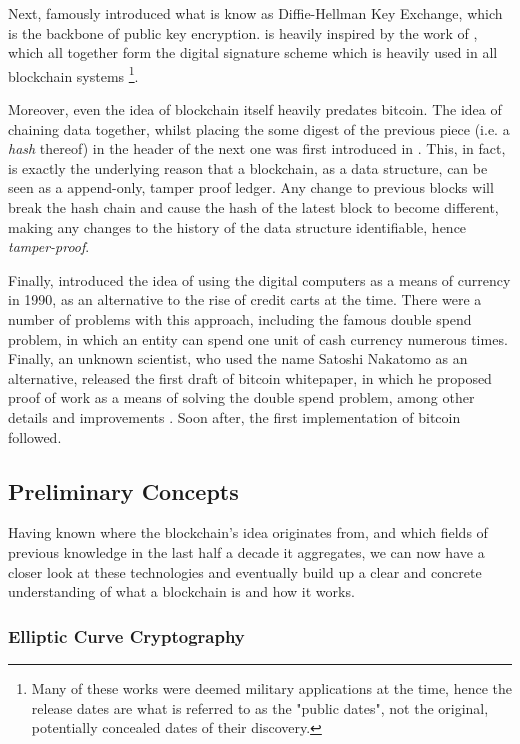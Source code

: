 Next, \cite{Diffie_Hellman_1976} famously introduced what is know as Diffie-Hellman Key Exchange,
which is the backbone of public key encryption. \cite{Diffie_Hellman_1976} is heavily inspired by
the work of \cite{Merkle_1978}, which all together form the digital signature scheme which is
heavily used in all blockchain systems \footnote{Many of these works were deemed military
applications at the time, hence the release dates are what is referred to as the "public dates", not
the original, potentially concealed dates of their discovery.}.

Moreover, even the idea of blockchain itself heavily predates bitcoin. The idea of chaining data
together, whilst placing the some digest of the previous piece (i.e. a \textit{hash} thereof) in the
header of the next one was first introduced in \cite{Timestamping_1991}. This, in fact, is exactly
the underlying reason that a blockchain, as a data structure, can be seen as a append-only, tamper
proof ledger. Any change to previous blocks will break the hash chain and cause the hash of the
latest block to become different, making any changes to the history of the data structure
identifiable, hence \textit{tamper-proof}.

Finally, \cite{Chaum_Fiat_Naor_1990} introduced the idea of using the digital computers as a means
of currency in 1990, as an alternative to the rise of credit carts at the time. There were a number
of problems with this approach, including the famous double spend problem, in which an entity can
spend one unit of cash currency numerous times. Finally, an unknown scientist, who used the name
Satoshi Nakatomo as an alternative, released the first draft of bitcoin whitepaper, in which he
proposed proof of work as a means of solving the double spend problem, among other details and
improvements \cite{Nakamoto}. Soon after, the first implementation of bitcoin followed.

\subsection{Preliminary Concepts} \label{chap_bg:sec:preliminary}

Having known where the blockchain's idea originates from, and which fields of previous knowledge in
the last half a decade it aggregates, we can now have a closer look at these technologies and
eventually build up a clear and concrete understanding of what a blockchain is and how it works.

\subsubsection{Elliptic Curve Cryptography} \label{chap_bg:subsec:ecc}

